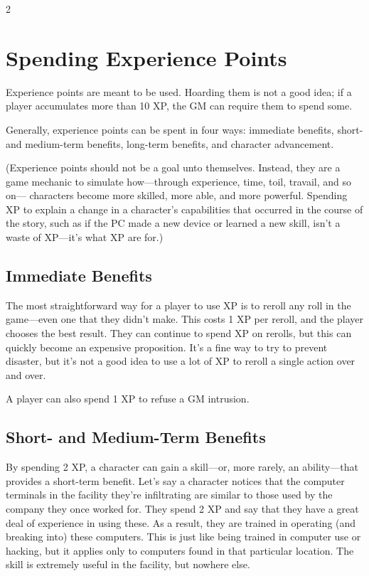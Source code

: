 \begin{multicols}{2}

\chapter{Spending Experience Points}

Experience points are meant to be used. Hoarding them is not a good idea; if a player accumulates more than 10 XP, the GM can require them to spend some.

Generally, experience points can be spent in four ways: immediate benefits, short- and medium-term benefits, long-term benefits, and character advancement.

(Experience points should not be a goal unto themselves. Instead, they are a game mechanic to simulate how—through experience, time, toil, travail, and so on— characters become more skilled, more able, and more powerful. Spending XP to explain a change in a character’s capabilities that occurred in the course of the story, such as if the PC made a new device or learned a new skill, isn’t a waste of XP—it’s what XP are for.)

\section{Immediate Benefits}

The most straightforward way for a player to use XP is to reroll any roll in the game—even one that they didn’t make. This costs 1 XP per reroll, and the player chooses the best result. They can continue to spend XP on rerolls, but this can quickly become an expensive proposition. It’s a fine way to try to prevent disaster, but it’s not a good idea to use a lot of XP to reroll a single action over and over.

A player can also spend 1 XP to refuse a GM intrusion.

\section{Short- and Medium-Term Benefits}

By spending 2 XP, a character can gain a skill—or, more rarely, an ability—that provides a short-term benefit. Let’s say a character notices that the computer terminals in the facility they’re infiltrating are similar to those used by the company they once worked for. They spend 2 XP and say that they have a great deal of experience in using these. As a result, they are trained in operating (and breaking into) these computers. This is just like being trained in computer use or hacking, but it applies only to computers found in that particular location. The skill is extremely useful in the facility, but nowhere else.


\end{multicols}
